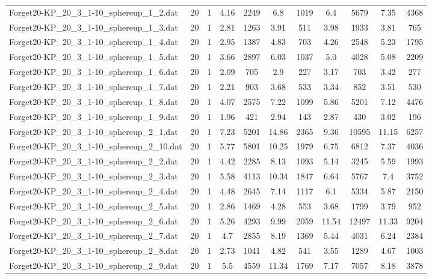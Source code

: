\begin{table}[!ht]
\begin{tabular}{lcccccccccc}
Forget20-KP\_20\_3\_1-10\_sphereup\_1\_2.dat & 20 & 1 & 4.16 & 2249 & 6.8 & 1019 & 6.4 & 5679 & 7.35 & 4368 \\
Forget20-KP\_20\_3\_1-10\_sphereup\_1\_3.dat & 20 & 1 & 2.81 & 1263 & 3.91 & 511 & 3.98 & 1933 & 3.81 & 765 \\
Forget20-KP\_20\_3\_1-10\_sphereup\_1\_4.dat & 20 & 1 & 2.95 & 1387 & 4.83 & 703 & 4.26 & 2548 & 5.23 & 1795 \\
Forget20-KP\_20\_3\_1-10\_sphereup\_1\_5.dat & 20 & 1 & 3.66 & 2897 & 6.03 & 1037 & 5.0 & 4028 & 5.08 & 2209 \\
Forget20-KP\_20\_3\_1-10\_sphereup\_1\_6.dat & 20 & 1 & 2.09 & 705 & 2.9 & 227 & 3.17 & 703 & 3.42 & 277 \\
Forget20-KP\_20\_3\_1-10\_sphereup\_1\_7.dat & 20 & 1 & 2.21 & 903 & 3.68 & 533 & 3.34 & 852 & 3.51 & 530 \\
Forget20-KP\_20\_3\_1-10\_sphereup\_1\_8.dat & 20 & 1 & 4.07 & 2575 & 7.22 & 1099 & 5.86 & 5201 & 7.12 & 4476 \\
Forget20-KP\_20\_3\_1-10\_sphereup\_1\_9.dat & 20 & 1 & 1.96 & 421 & 2.94 & 143 & 2.87 & 430 & 3.02 & 196 \\
Forget20-KP\_20\_3\_1-10\_sphereup\_2\_1.dat & 20 & 1 & 7.23 & 5201 & 14.86 & 2365 & 9.36 & 10595 & 11.15 & 6257 \\
Forget20-KP\_20\_3\_1-10\_sphereup\_2\_10.dat & 20 & 1 & 5.77 & 5801 & 10.25 & 1979 & 6.75 & 6812 & 7.37 & 4036 \\
Forget20-KP\_20\_3\_1-10\_sphereup\_2\_2.dat & 20 & 1 & 4.42 & 2285 & 8.13 & 1093 & 5.14 & 3245 & 5.59 & 1993 \\
Forget20-KP\_20\_3\_1-10\_sphereup\_2\_3.dat & 20 & 1 & 5.58 & 4113 & 10.34 & 1847 & 6.64 & 5767 & 7.4 & 3752 \\
Forget20-KP\_20\_3\_1-10\_sphereup\_2\_4.dat & 20 & 1 & 4.48 & 2645 & 7.14 & 1117 & 6.1 & 5334 & 5.87 & 2150 \\
Forget20-KP\_20\_3\_1-10\_sphereup\_2\_5.dat & 20 & 1 & 2.86 & 1469 & 4.28 & 553 & 3.68 & 1799 & 3.79 & 952 \\
Forget20-KP\_20\_3\_1-10\_sphereup\_2\_6.dat & 20 & 1 & 5.26 & 4293 & 9.99 & 2059 & 11.54 & 12497 & 11.33 & 9204 \\
Forget20-KP\_20\_3\_1-10\_sphereup\_2\_7.dat & 20 & 1 & 4.7 & 2855 & 8.19 & 1369 & 5.44 & 4031 & 6.24 & 2384 \\
Forget20-KP\_20\_3\_1-10\_sphereup\_2\_8.dat & 20 & 1 & 2.73 & 1041 & 4.82 & 541 & 3.55 & 1289 & 4.67 & 1003 \\
Forget20-KP\_20\_3\_1-10\_sphereup\_2\_9.dat & 20 & 1 & 5.5 & 4559 & 11.34 & 1769 & 7.17 & 7057 & 8.18 & 3878 \\

\end{tabular}
\end{table}
